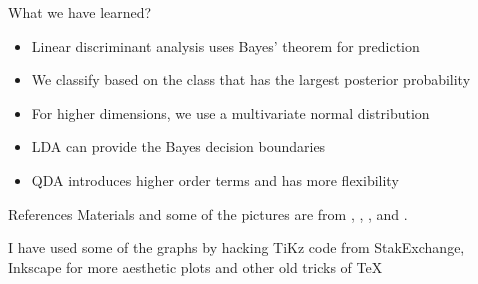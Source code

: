 \documentclass{beamer}
\begin{document}
\begin{frame}{What we have learned?	}
	\begin{itemize}
		\item Linear discriminant analysis uses Bayes' theorem for prediction
		\item We classify based on the class that has the largest posterior probability
		\item For higher dimensions, we use a multivariate normal distribution
		\item LDA can provide the Bayes decision boundaries
		\item QDA introduces higher order terms and has more flexibility
	\end{itemize}
\end{frame}

\begin{frame}{References}
	Materials and some of the pictures are from \citep{James2015}, \citep{hastie01}, \citep{geron2}, and \citep{pestman}.
	\printbibliography 	
	
	I have used some of the graphs by hacking TiKz code from StakExchange, Inkscape for more aesthetic plots and other old tricks of \TeX
	
\end{frame}
\end{document}
